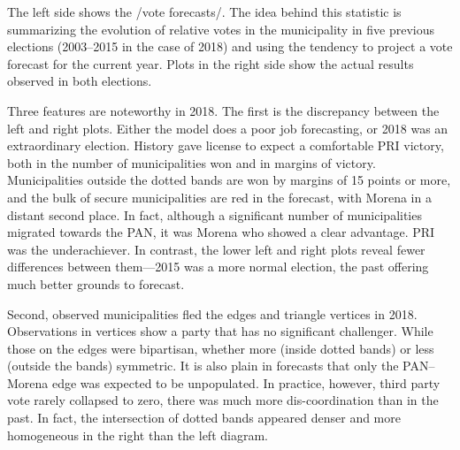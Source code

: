 \documentclass[letter,12pt]{article}
\begin{document}

The left side shows the /vote forecasts/. The idea behind this statistic is summarizing the evolution of relative votes in the municipality in five previous elections (2003--2015 in the case of 2018) and using the tendency to project a vote forecast for the current year. Plots in the right side show the actual results observed in both elections.

Three features are noteworthy in 2018. The first is the discrepancy between the left and right plots. Either the model does a poor job forecasting, or 2018 was an extraordinary election. History gave license to expect a comfortable PRI victory, both in the number of municipalities won and in margins of victory. Municipalities outside the dotted bands are won by margins of 15 points or more, and the bulk of secure municipalities are red in the forecast, with Morena in a distant second place. In fact, although a significant number of municipalities migrated towards the PAN, it was Morena who showed a clear advantage. PRI was the underachiever. In contrast, the lower left and right plots reveal fewer differences between them---2015 was a more normal election, the past offering much better grounds to forecast. 

Second, observed municipalities fled the edges and triangle vertices in 2018. Observations in vertices show a party that has no significant challenger. While those on the edges were bipartisan, whether more (inside dotted bands) or less (outside the bands) symmetric. It is also plain in forecasts that only the PAN--Morena edge was expected to be unpopulated. In practice, however, third party vote rarely collapsed to zero, there was much more dis-coordination than in the past. In fact, the intersection of dotted bands appeared denser and more homogeneous in the right than the left diagram. 
\end{document}

